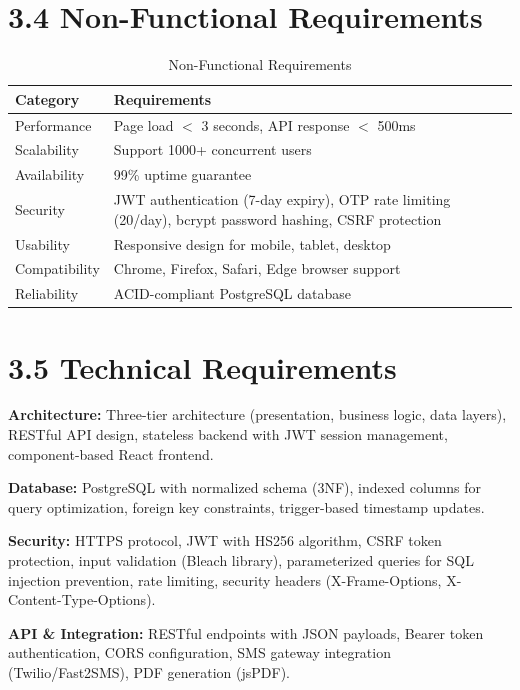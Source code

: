 \documentclass[12pt,a4paper]{report}
\begin{document}
\section*{3.4 Non-Functional Requirements}

\begin{table}[h]
\centering
\small
\begin{tabular}{|p{2.5cm}|p{10.5cm}|}
\hline
\textbf{Category} & \textbf{Requirements} \\
\hline
Performance & Page load $<$ 3 seconds, API response $<$ 500ms \\
\hline
Scalability & Support 1000+ concurrent users \\
\hline
Availability & 99\% uptime guarantee \\
\hline
Security & JWT authentication (7-day expiry), OTP rate limiting (20/day), bcrypt password hashing, CSRF protection \\
\hline
Usability & Responsive design for mobile, tablet, desktop \\
\hline
Compatibility & Chrome, Firefox, Safari, Edge browser support \\
\hline
Reliability & ACID-compliant PostgreSQL database \\
\hline
\end{tabular}
\caption{Non-Functional Requirements}
\end{table}

\section*{3.5 Technical Requirements}

\textbf{Architecture:} Three-tier architecture (presentation, business logic, data layers), RESTful API design, stateless backend with JWT session management, component-based React frontend.

\textbf{Database:} PostgreSQL with normalized schema (3NF), indexed columns for query optimization, foreign key constraints, trigger-based timestamp updates.

\textbf{Security:} HTTPS protocol, JWT with HS256 algorithm, CSRF token protection, input validation (Bleach library), parameterized queries for SQL injection prevention, rate limiting, security headers (X-Frame-Options, X-Content-Type-Options).

\textbf{API \& Integration:} RESTful endpoints with JSON payloads, Bearer token authentication, CORS configuration, SMS gateway integration (Twilio/Fast2SMS), PDF generation (jsPDF).
\end{document}
